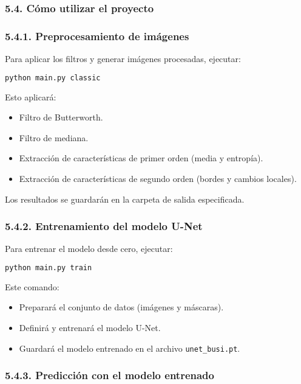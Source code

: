 \documentclass[12pt]{article}
\begin{document}
\subsubsection*{5.4. Cómo utilizar el proyecto}

\subsubsection*{5.4.1. Preprocesamiento de imágenes}

Para aplicar los filtros y generar imágenes procesadas, ejecutar:

\begin{lstlisting}[language=bash]
python main.py classic
\end{lstlisting}

Esto aplicará:
\begin{itemize}
    \item Filtro de Butterworth.
    \item Filtro de mediana.
    \item Extracción de características de primer orden (media y entropía).
    \item Extracción de características de segundo orden (bordes y cambios locales).
\end{itemize}

Los resultados se guardarán en la carpeta de salida especificada.

\subsubsection*{5.4.2. Entrenamiento del modelo U-Net}

Para entrenar el modelo desde cero, ejecutar:

\begin{lstlisting}[language=bash]
python main.py train
\end{lstlisting}

Este comando:
\begin{itemize}
    \item Preparará el conjunto de datos (imágenes y máscaras).
    \item Definirá y entrenará el modelo U-Net.
    \item Guardará el modelo entrenado en el archivo \texttt{unet\_busi.pt}.
\end{itemize}

\subsubsection*{5.4.3. Predicción con el modelo entrenado}
\end{document}
